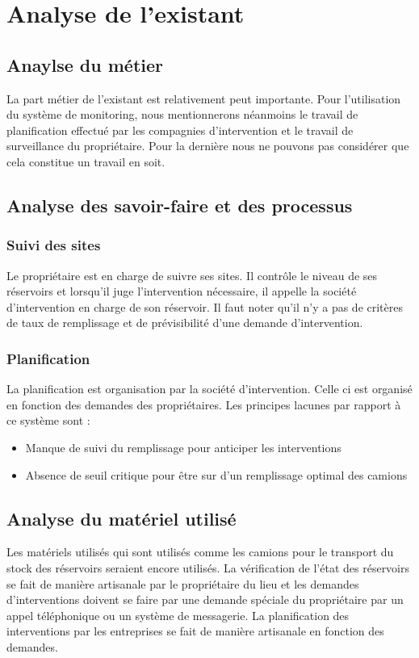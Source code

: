 \section{Analyse de l'existant}

\subsection{Anaylse du métier}

La part métier de l'existant est relativement peut importante. Pour l'utilisation du système de monitoring, nous mentionnerons néanmoins le travail de planification effectué par les compagnies d'intervention et le travail de surveillance du propriétaire. Pour la dernière nous ne pouvons pas considérer que cela constitue un travail en soit.

\subsection{Analyse des savoir-faire et des processus}

\subsubsection{Suivi des sites}

Le propriétaire est en charge de suivre ses sites. Il contrôle le niveau de ses réservoirs et lorsqu'il juge l'intervention nécessaire, il appelle la société d'intervention en charge de son réservoir. Il faut noter qu'il n'y a pas de critères de taux de remplissage et de prévisibilité d'une demande d'intervention.

\subsubsection{Planification}

La planification est organisation par la société d'intervention. Celle ci est organisé en fonction des demandes des propriétaires. Les principes lacunes par rapport à ce système sont : 
\begin{itemize}
\item Manque de suivi du remplissage pour anticiper les interventions
\item Absence de seuil critique pour être sur d'un remplissage optimal des camions
\end{itemize}

\subsection{Analyse du matériel utilisé}

Les matériels utilisés qui sont utilisés comme les camions pour le transport du stock des réservoirs seraient encore utilisés. La vérification de l'état des réservoirs se fait de manière artisanale par le propriétaire du lieu et les demandes d'interventions doivent se faire par une demande spéciale du propriétaire par un appel téléphonique ou un système de messagerie. La planification des interventions par les entreprises se fait de manière artisanale en fonction des demandes.




